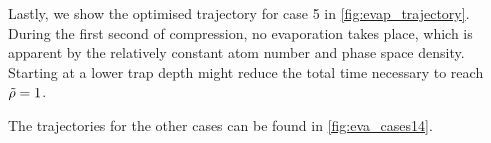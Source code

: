 Lastly, we show the optimised trajectory for case 5 in \cref{fig:evap_trajectory}. During the first second of compression, no evaporation takes place, which is apparent by the relatively constant atom number and phase space density. Starting at a lower trap depth might reduce the total time necessary to reach $\tilde{\rho} = 1$.

The trajectories for the other cases can be found in \cref{fig:eva_cases14}.
%
%

